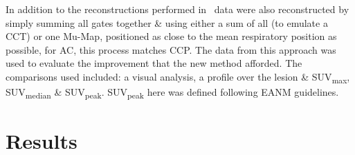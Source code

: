         In addition to the reconstructions performed in~ data were also reconstructed by simply summing all gates together \& using either a sum of all  (to emulate a \gls{CCT}) or one \gls{Mu-Map}, positioned as close to the mean respiratory position as possible, for \gls{AC}, this process matches \gls{CCP}. The data from this approach was used to evaluate the improvement that the new method afforded. The comparisons used included: a visual analysis, a profile over the lesion \& \gls{SUV}\textsubscript{max}, \gls{SUV}\textsubscript{median} \& \gls{SUV}\textsubscript{peak}. \gls{SUV}\textsubscript{peak} here was defined following \gls{EANM} guidelines.%

\section{Results} \label{sec:results}
    
    
